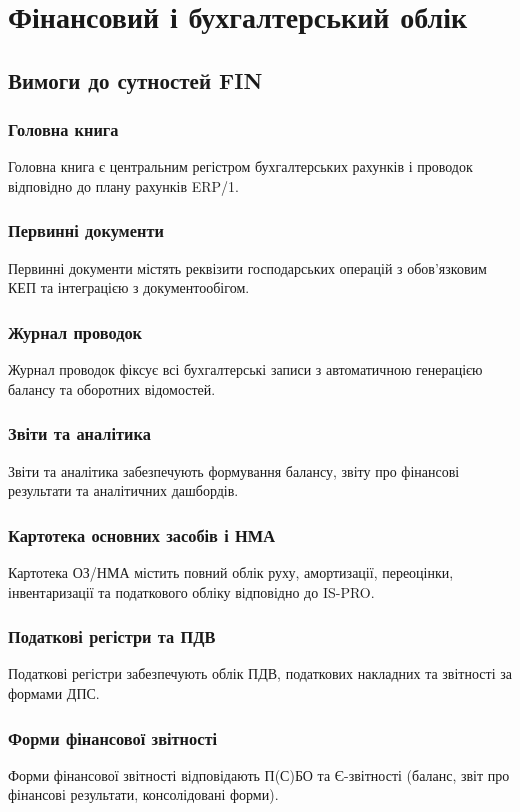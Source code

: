 \documentclass{article}
\begin{document}
\newpage
\section{Фінансовий і бухгалтерський облік}

\subsection{Вимоги до сутностей FIN}

\subsubsection{Головна книга}
Головна книга є центральним регістром бухгалтерських рахунків і проводок відповідно до плану рахунків ERP/1.

\subsubsection{Первинні документи}
Первинні документи містять реквізити господарських операцій з обов’язковим КЕП та інтеграцією з документообігом.

\subsubsection{Журнал проводок}
Журнал проводок фіксує всі бухгалтерські записи з автоматичною генерацією балансу та оборотних відомостей.

\subsubsection{Звіти та аналітика}
Звіти та аналітика забезпечують формування балансу, звіту про фінансові результати та аналітичних дашбордів.

\subsubsection{Картотека основних засобів і НМА}
Картотека ОЗ/НМА містить повний облік руху, амортизації, переоцінки, інвентаризації та податкового обліку відповідно до IS-PRO.

\subsubsection{Податкові регістри та ПДВ}
Податкові регістри забезпечують облік ПДВ, податкових накладних та звітності за формами ДПС.

\subsubsection{Форми фінансової звітності}
Форми фінансової звітності відповідають П(С)БО та Є-звітності (баланс, звіт про фінансові результати, консолідовані форми).
\end{document}
